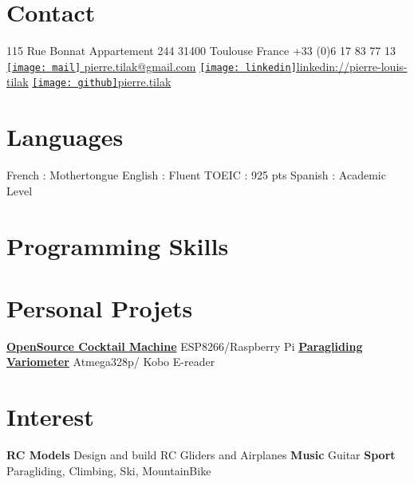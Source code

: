 \documentclass[a4paper]{friggeri-cv} %
\begin{document}


\begin{aside} %
\section{Contact}
115 Rue Bonnat
Appartement 244
31400 Toulouse
France
+33 (0)6 17 83 77 13
~
\href{mailto:pierre.tilak@gmail.com}{\texttt{[image: mail]} pierre.tilak@gmail.com}
\href{https://www.linkedin.com/pub/pierre-louis-tilak/96/162/a83}{\texttt{[image: linkedin]}linkedin://pierre-louis-tilak}
\href{https://github.com/tilaktilak}{\texttt{[image: github]}pierre.tilak}
\section{Languages}
French : Mothertongue
English : Fluent
TOEIC : 925 pts 
Spanish : Academic Level\bigskip\bigskip
\section{Programming Skills}
\bigskip\bigskip
\section{Personal Projets}
\href{https://github.com/tilaktilak/Inebriator}{\textbf{OpenSource Cocktail Machine}}
ESP8266/Raspberry Pi\bigskip
\href{https://github.com/tilaktilak/xcvario}{\textbf{Paragliding Variometer}}
Atmega328p/ Kobo E-reader\bigskip\bigskip
\section{Interest}
\textbf{RC Models} Design and build RC Gliders and Airplanes
\textbf{Music} Guitar
\textbf{Sport} Paragliding, Climbing, Ski, MountainBike
\end{aside}
\end{document}
